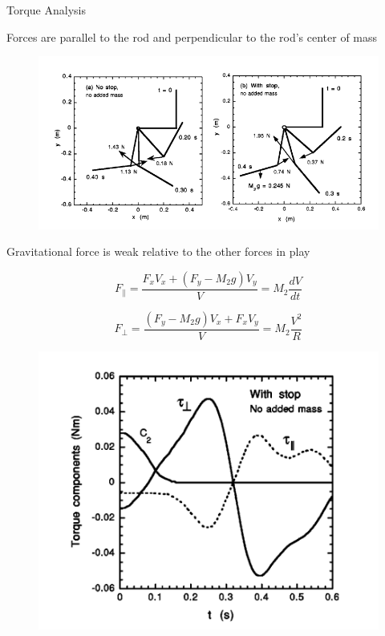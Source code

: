 \documentclass[tikz]{beamer}
\begin{document}
\begin{frame} {Torque Analysis}

	 {
		Forces are parallel to the rod and perpendicular to the rod's center of mass
		\begin{figure}
			\centering
			\includegraphics[scale=0.4]{torque.png}
		\end{figure}
		Gravitational force is weak relative to the other forces in play
	}

	 {
		\begin{equation}
			F_{\parallel}=\frac{F_x V_x + (F_y - M_2 g) V_y}{V} = M_2 \frac{dV}{dt} \tag{10}
		\end{equation}

		\begin{equation}
			F_{\perp}=\frac{(F_y - M_2 g)V_x+ F_x V_y}{V} = M_2 \frac{V^2}{R} \tag{11}
		\end{equation}

		\begin{figure}
			\centering
			\includegraphics[scale=0.4]{totaltorque.png}
		\end{figure}
	}


\end{frame}
\end{document}
